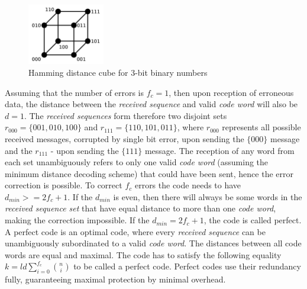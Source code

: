 \begin{figure}[H]
\centering
\includegraphics[width=0.3\textwidth]{figures/Hamming_distance.png}
\caption{Hamming distance cube for 3-bit binary numbers~\cite{web:hamming_dist}}
\label{fig:hamming_dist}
\end{figure}

Assuming that the number of errors is $f_c = 1$, then upon reception of erroneous data, the distance between the \textit{received sequence} and valid \textit{code word} will also be $d = 1$. The \textit{received sequences} form therefore two disjoint sets $r_{000}=\{001,010,100\}$ and $r_{111}=\{110,101,011\}$, where $r_{000}$ represents all possible received messages, corrupted by single bit error, upon sending the $\{000\}$ message and the $r_{111}$ - upon sending the $\{111\}$ message. The reception of any word from each set unambiguously refers to only one valid \textit{code word} (assuming the minimum distance decoding scheme) that could have been sent, hence the error correction is possible. To correct $f_c$ errors the code needs to have $d_{min} >= 2f_c+1$. If the $d_{min}$ is even, then there will always be some words in the \textit{received sequence set} that have equal distance to more than one \textit{code word}, making the correction impossible. If the $d_{min} = 2f_c+1$, the code is called perfect. A perfect code is an optimal code, where every \textit{received sequence} can be unambiguously subordinated to a valid \textit{code word}. The distances between all code words are equal and maximal. The code has to satisfy the following equality $k=ld\sum_{i=0}^{f_c} \binom{n}{i}$ to be called a perfect code. Perfect codes use their redundancy fully, guaranteeing maximal protection by minimal overhead.


